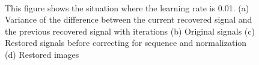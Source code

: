 \documentclass[UTF8,12pt]{article}
\begin{document}
	\begin{figure}[!ht]
		\centering
		\quad
		\\
		\quad
		\caption{\label{fig:sound2}This figure shows the situation where the learning rate is 0.01. (a) Variance of the difference between the current recovered signal and the previous recovered signal with iterations (b) Original signals (c) Restored signals before correcting for sequence and normalization (d) Restored images}
	\end{figure}
\end{document}
